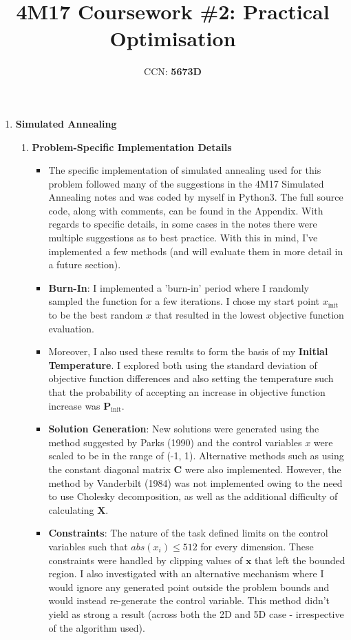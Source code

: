 \documentclass[12pt]{article}
\title{4M17 Coursework \#2: Practical Optimisation}
\author{CCN: \textbf{5673D}}
\begin{document}
\maketitle

\begin{enumerate}
	\item \textbf{Simulated Annealing}
	\begin{enumerate}
	\item \textbf{Problem-Specific Implementation Details}
	\begin{itemize}
		\item The specific implementation of simulated annealing used for this problem followed many of the suggestions in the 4M17 Simulated Annealing notes and was coded by myself in Python3. The full source code, along with comments, can be found in the Appendix. With regards to specific details, in some cases in the notes there were multiple suggestions as to best practice. With this in mind, I've implemented a few methods (and will evaluate them in more detail in a future section).
		\item \textbf{Burn-In}: I implemented a 'burn-in' period where I randomly sampled the function for a few iterations. I chose my start point $x_{\text{init}}$ to be the best random $x$ that resulted in the lowest objective function evaluation. 
		\item Moreover, I also used these results to form the basis of my \textbf{Initial Temperature}. I explored both using the standard deviation of objective function differences and also setting the temperature such that the probability of accepting an increase in objective function increase was $\bm{P}_{\text{init}}$.
		\item \textbf{Solution Generation}: New solutions were generated using the method suggested by Parks (1990) and the control variables $x$ were scaled to be in the range of (-1, 1). Alternative methods such as using the constant diagonal matrix $\bm{C}$ were also implemented. However, the method by Vanderbilt (1984) was not implemented owing to the need to use Cholesky decomposition, as well as the additional difficulty of calculating $\bm{X}$.
		\item \textbf{Constraints}: The nature of the task defined limits on the control variables such that $abs(x_{i}) \leq 512$ for every dimension. These constraints were handled by clipping values of $\bm{x}$ that left the bounded region. I also investigated with an alternative mechanism where I would ignore any generated point outside the problem bounds and would instead re-generate the control variable. This method didn't yield as strong a result (across both the 2D and 5D case - irrespective of the algorithm used).

\end{itemize}
\end{enumerate}
\end{enumerate}
\end{document}

